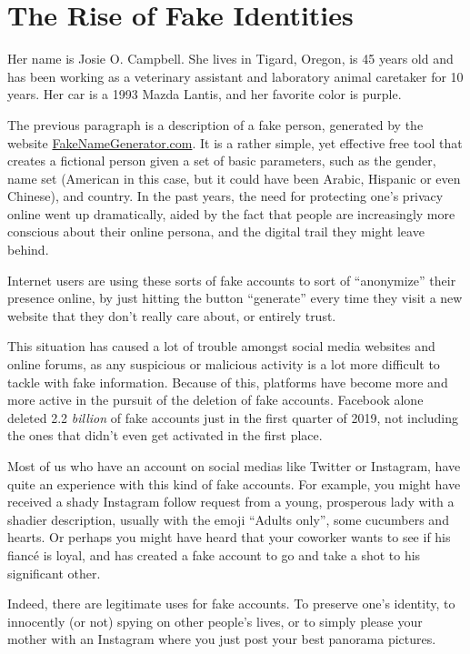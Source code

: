 \section{The Rise of Fake Identities}

Her name is Josie O. Campbell. She lives in Tigard, Oregon, is 45 years old and has been working as a veterinary assistant and laboratory animal caretaker for 10 years. Her car is a 1993 Mazda Lantis, and her favorite color is purple.

The previous paragraph is a description of a fake person, generated by the website \href{https://fakenamegenerator.com}{FakeNameGenerator.com}. It is a rather simple, yet effective free tool that creates a fictional person given a set of basic parameters, such as the gender, name set (American in this case, but it could have been Arabic, Hispanic or even Chinese), and country. In the past years, the need for protecting one's privacy online went up dramatically, aided by the fact that people are increasingly more conscious about their online persona, and the digital trail they might leave behind.

Internet users are using these sorts of fake accounts to sort of ``anonymize'' their presence online, by just hitting the button ``generate'' every time they visit a new website that they don't really care about, or entirely trust.

This situation has caused a lot of trouble amongst social media websites and online forums, as any suspicious or malicious activity is a lot more difficult to tackle with fake information. Because of this, platforms have become more and more active in the pursuit of the deletion of fake accounts. Facebook alone deleted 2.2 \textit{billion} of fake accounts just in the first quarter of 2019, not including the ones that didn't even get activated in the first place.

Most of us who have an account on social medias like Twitter or Instagram, have quite an experience with this kind of fake accounts. For example, you might have received a shady Instagram follow request from a young, prosperous lady with a shadier description, usually with the emoji ``Adults only'', some cucumbers and hearts. Or perhaps you might have heard that your coworker wants to see if his fiancé is loyal, and has created a fake account to go and take a shot to his significant other.

Indeed, there are legitimate uses for fake accounts. To preserve one's identity, to innocently (or not) spying on other people's lives, or to simply please your mother with an Instagram where you just post your best panorama pictures.

